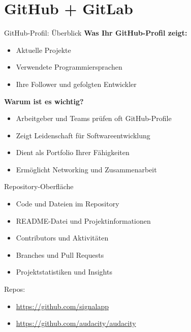 \documentclass[compress,aspectratio=169]{beamer}
\begin{document}
	\section{GitHub + GitLab}

	\begin{frame}{GitHub-Profil: Überblick}
		\textbf{Was Ihr GitHub-Profil zeigt:}
		\begin{itemize}
			\item Aktuelle Projekte
			\item Verwendete Programmiersprachen
			\item Ihre Follower und gefolgten Entwickler
		\end{itemize}
		\vspace{1em}
		\textbf{Warum ist es wichtig?}
		\begin{itemize}
			\item Arbeitgeber und Teams prüfen oft GitHub-Profile
			\item Zeigt Leidenschaft für Softwareentwicklung
			\item Dient als Portfolio Ihrer Fähigkeiten
			\item Ermöglicht Networking und Zusammenarbeit
		\end{itemize}
	\end{frame}

	\begin{frame}{Repository-Oberfläche}
		\begin{itemize}
			\item Code und Dateien im Repository
			\item README-Datei und Projektinformationen
			\item Contributors und Aktivitäten
			\item Branches und Pull Requests
			\item Projektstatistiken und Insights
		\end{itemize}
		Repos: 
		\begin{itemize}
			\item \url{https://github.com/signalapp}
			\item \url{https://github.com/audacity/audacity}
		\end{itemize}
	\end{frame}


	
\end{document}
